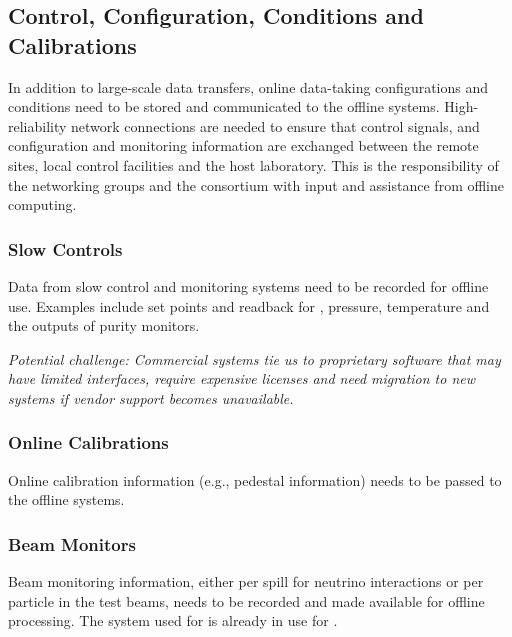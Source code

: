 \documentclass[../main-v1.tex]{subfiles}
\begin{document}
\subsection{Control, Configuration, Conditions and Calibrations}
In addition to large-scale data transfers, online data-taking configurations and conditions need to be stored and communicated to the offline systems. High-reliability network connections are needed to ensure that control signals, and configuration and monitoring information are exchanged between the remote sites, local control facilities and the host laboratory.
This is the responsibility of the  networking groups and the  consortium with input and assistance from offline computing. 


\subsubsection{Slow Controls}
Data from slow control and monitoring systems need to be recorded for offline use.  Examples include set points and readback for , %
pressure, temperature and the outputs of purity monitors. 

{\it Potential challenge: Commercial  systems tie us to proprietary software that may have limited interfaces, require expensive licenses and need migration to new systems if %
vendor support becomes unavailable.}

\subsubsection{Online Calibrations}
Online calibration information (e.g., pedestal information) needs to be passed to the offline systems. 


\subsubsection{Beam Monitors}
Beam monitoring information, either per spill for neutrino interactions or per particle in the  test beams, needs to be recorded and made available for offline processing. 
The  system used for  is already in use for .
\end{document}
